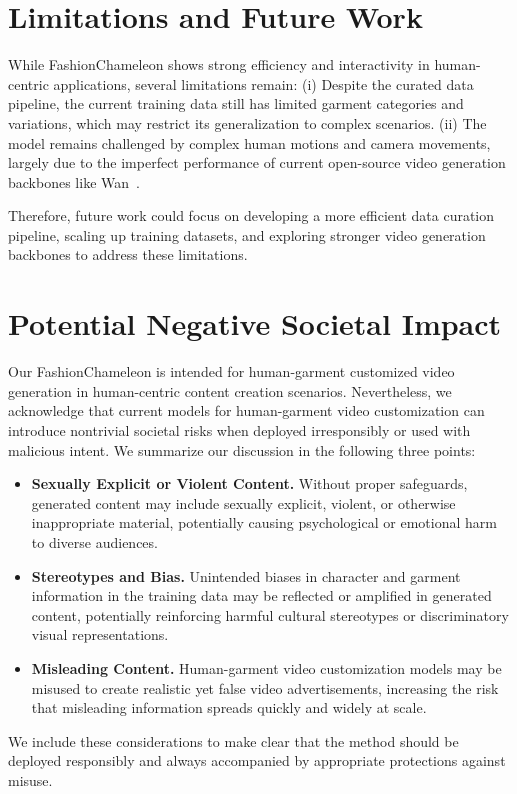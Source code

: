 \documentclass{llmxive}
\providecommand{\method}{FashionChameleon\xspace}
\begin{document}
\section{Limitations and Future Work}
%
While \method shows strong efficiency and interactivity in human-centric applications, several limitations remain: 
% 
(i) Despite the curated data pipeline, the current training data still has limited garment categories and variations, which may restrict its generalization to complex scenarios.
% 
(ii) The model remains challenged by complex human motions and camera movements, largely due to the imperfect performance of current open-source video generation backbones like Wan~\cite{wan2025wan}.


Therefore, future work could focus on developing a more efficient data curation pipeline, scaling up training datasets, and exploring stronger video generation backbones to address these limitations.



\section{Potential Negative Societal Impact}
%
Our \method is intended for human-garment customized video generation in human-centric content creation scenarios.
Nevertheless, we acknowledge that current models for human-garment video customization can introduce nontrivial societal risks when deployed irresponsibly or used with malicious intent.
% 
We summarize our discussion in the following three points:
% 
\begin{itemize}
    \item \textbf{Sexually Explicit or Violent Content.} Without proper safeguards, generated content may include sexually explicit, violent, or otherwise inappropriate material, potentially causing psychological or emotional harm to diverse audiences.
    \item \textbf{Stereotypes and Bias.} Unintended biases in character and garment information in the training data may be reflected or amplified in generated content, potentially reinforcing harmful cultural stereotypes or discriminatory visual representations.
    \item \textbf{Misleading Content.} Human-garment video customization models may be misused to create realistic yet false video advertisements, increasing the risk that misleading information spreads quickly and widely at scale.
\end{itemize}
% 
We include these considerations to make clear that the method should be deployed responsibly and always accompanied by appropriate protections against misuse.
\end{document}
